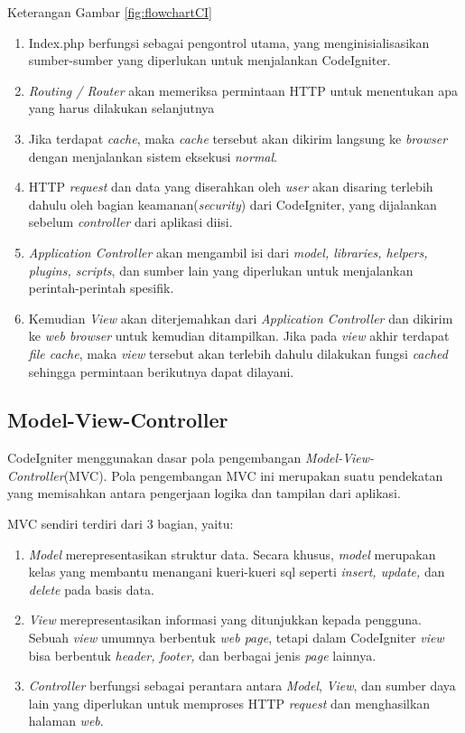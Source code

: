 Keterangan Gambar \ref{fig:flowchartCI}
\begin{enumerate}
	\item Index.php berfungsi sebagai pengontrol utama, yang menginisialisasikan sumber-sumber yang diperlukan untuk menjalankan CodeIgniter.
	\item \textit{Routing / Router} akan memeriksa permintaan HTTP untuk menentukan apa yang harus dilakukan selanjutnya
	\item Jika terdapat \textit{cache}, maka \textit{cache} tersebut akan dikirim langsung ke \textit{browser} dengan menjalankan sistem eksekusi \textit{normal}.
	\item  HTTP \textit{request} dan data yang diserahkan oleh \textit{user} akan disaring terlebih dahulu oleh bagian keamanan(\textit{security}) dari CodeIgniter, yang dijalankan sebelum \textit{controller} dari aplikasi diisi.
	\item \textit{Application Controller} akan mengambil isi dari \textit{model, libraries, helpers, plugins, scripts}, dan sumber lain yang diperlukan untuk menjalankan perintah-perintah spesifik.
	\item Kemudian \textit{View} akan diterjemahkan dari \textit{Application Controller} dan dikirim ke \textit{web browser} untuk kemudian ditampilkan. Jika pada \textit{view} akhir terdapat \textit{file cache}, maka \textit{view} tersebut akan terlebih dahulu dilakukan fungsi \textit{cached} sehingga permintaan berikutnya dapat dilayani.
\end{enumerate}

\subsection{Model-View-Controller}
\label{sub: MVC}

CodeIgniter menggunakan dasar pola pengembangan \textit{Model-View-Controller}(MVC). Pola pengembangan MVC ini merupakan suatu pendekatan yang memisahkan antara pengerjaan logika dan tampilan dari aplikasi.

MVC sendiri terdiri dari 3 bagian, yaitu:
\begin{enumerate}
	\item \textit{Model} merepresentasikan struktur data. Secara khusus, \textit{model} merupakan kelas yang membantu menangani kueri-kueri sql seperti \textit{insert, update,} dan \textit{delete} pada basis data.
	\item \textit{View} merepresentasikan informasi yang ditunjukkan kepada pengguna. Sebuah \textit{view} umumnya berbentuk \textit{web page}, tetapi dalam CodeIgniter \textit{view} bisa berbentuk \textit{header, footer,} dan berbagai jenis \textit{page} lainnya.
	\item \textit{Controller} berfungsi sebagai perantara antara \textit{Model}, \textit{View}, dan sumber daya lain yang diperlukan untuk memproses HTTP \textit{request} dan menghasilkan halaman \textit{web}.
\end{enumerate}

